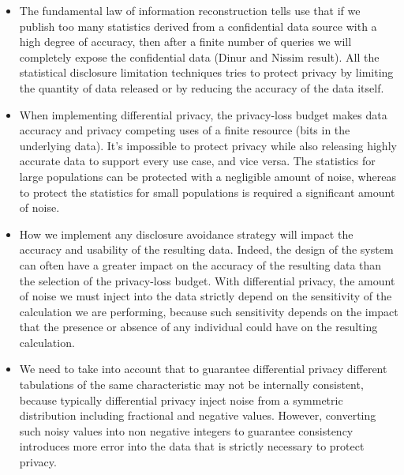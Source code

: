 \begin{itemize}
\item The fundamental law of information reconstruction tells use that if we publish too many statistics derived from a confidential data source with a high degree of accuracy, then after a finite number of queries we will completely expose the confidential data (Dinur and Nissim result). All the statistical disclosure limitation techniques tries to protect privacy by limiting the quantity of data released or by reducing the accuracy of the data itself.
\item When implementing differential privacy, the privacy-loss budget makes data accuracy and privacy competing uses of a finite resource (bits in the underlying data). It's impossible to protect privacy while also releasing highly accurate data to support every use case, and vice versa. The statistics for large populations can be protected with a negligible amount of noise, whereas to protect the statistics for small populations is required a significant amount of noise.
\item How we implement any disclosure avoidance strategy will impact the accuracy and usability of the resulting data. Indeed, the design of the system can often have a greater impact on the accuracy of the resulting data than the selection of the privacy-loss budget. With differential privacy, the amount of noise we must inject into the data strictly depend on the sensitivity of the calculation we are performing, because such sensitivity depends on the impact that the presence or absence of any individual could have on the resulting calculation.
\item We need to take into account that to guarantee differential privacy different tabulations of the same characteristic may not be internally consistent, because typically differential privacy inject noise from a symmetric distribution including fractional and negative values. However, converting such noisy values into non negative integers to guarantee consistency introduces more error into the data that is strictly necessary to protect privacy.
\end{itemize}

